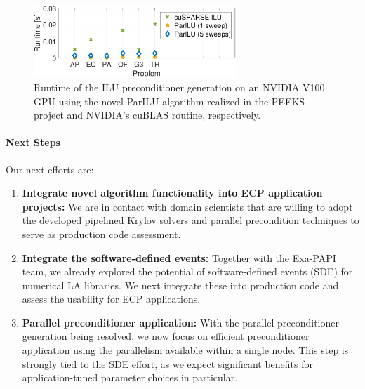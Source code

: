 \begin{figure}[htb]
	\centering
	\includegraphics[width=3in]{projects/2.3.3-MathLibs/2.3.3.10-PEEKS/runtime2}
	\caption{\label{fig:ILUperf}Runtime of the ILU preconditioner generation on 
	an NVIDIA V100 GPU using the novel ParILU algorithm realized in the PEEKS 
	project and NVIDIA's cuBLAS routine, respectively.}
\end{figure}


\paragraph{Next Steps}


Our next efforts are:
\begin{enumerate}
	\item \textbf{Integrate novel algorithm functionality into ECP application 
	projects:} We are in contact with domain scientists that are willing to 
	adopt the developed pipelined Krylov solvers and parallel precondition 
	techniques to serve as production code assessment.
	\item \textbf{Integrate the software-defined events:} Together with the 
	Exa-PAPI team, we already explored the potential of software-defined events 
	(SDE) for numerical LA libraries. We next integrate these into production 
	code and assess the usability for ECP applications.
	\item \textbf{Parallel preconditioner application:} With the parallel 
	preconditioner generation being resolved, we now focus on efficient 
	preconditioner application using the parallelism available within a single 
	node. This step is strongly tied to the SDE effort, as we expect significant 
	benefits for application-tuned parameter choices in particular.
\end{enumerate}
